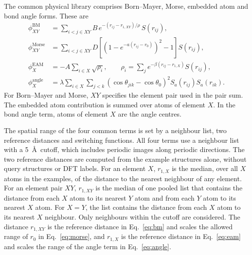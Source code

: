 The common physical library comprises Born--Mayer, Morse, embedded atom and bond angle forms. These are
\begin{align}
\phi^{\mathrm{BM}}_{XY}&=\sum_{i<j\in XY}B\,e^{-(r_{ij}-r_{1,XY})/\rho}\,S(r_{ij}), \label{eq:bm}\\
\phi^{\mathrm{Morse}}_{XY}&=\sum_{i<j\in XY}D\left[\left(1-e^{-a(r_{ij}-r_0)}\right)^2-1\right]S(r_{ij}), \label{eq:morse}\\
\phi^{\mathrm{EAM}}_X&=-A\sum_{i\in X}\sqrt{\rho_i},\qquad \rho_i=\sum_j e^{-\beta(r_{ij}-r_{1,X})}S(r_{ij}), \label{eq:eam}\\
\phi^{\mathrm{angle}}_X&=\lambda\sum_{i\in X}\sum_{j<k}\left(\cos\theta_{jik}-\cos\theta_0\right)^2S_a(r_{ij})S_a(r_{ik}). \label{eq:angle}
\end{align}
For Born--Mayer and Morse, $XY$ specifies the element pair used in the pair sum. The embedded atom contribution is summed over atoms of element $X$. In the bond angle term, atoms of element $X$ are the angle centres.

The spatial range of the four common terms is set by a neighbour list, two reference distances and switching functions. All four terms use a neighbour list with a 5~\AA\ cutoff, which includes periodic images along periodic directions. The two reference distances are computed from the example structures alone, without query structures or DFT labels. For an element $X$, $r_{1,X}$ is the median, over all $X$ atoms in the examples, of the distance to the nearest neighbour of any element. For an element pair $XY$, $r_{1,XY}$ is the median of one pooled list that contains the distance from each $X$ atom to its nearest $Y$ atom and from each $Y$ atom to its nearest $X$ atom. For $X=Y$, the list contains the distance from each $X$ atom to its nearest $X$ neighbour. Only neighbours within the cutoff are considered. The distance $r_{1,XY}$ is the reference distance in Eq.~\eqref{eq:bm} and scales the allowed range of $r_0$ in Eq.~\eqref{eq:morse}, and $r_{1,X}$ is the reference distance in Eq.~\eqref{eq:eam} and scales the range of the angle term in Eq.~\eqref{eq:angle}.

